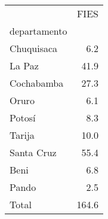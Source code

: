 \begin{tabular}{lr}
\toprule
{} &   FIES \\
departamento &        \\
\midrule
Chuquisaca   &    6.2 \\
La Paz       &   41.9 \\
Cochabamba   &   27.3 \\
Oruro        &    6.1 \\
Potosí       &    8.3 \\
Tarija       &   10.0 \\
Santa Cruz   &   55.4 \\
Beni         &    6.8 \\
Pando        &    2.5 \\
Total        &  164.6 \\
\bottomrule
\end{tabular}
